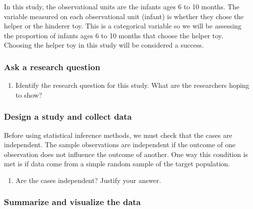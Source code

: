 \documentclass[
]{report}
\providecommand{\tightlist}{%
  \setlength{\itemsep}{0pt}\setlength{\parskip}{0pt}}
\begin{document}
In this study, the observational units are the infants ages 6 to 10 months. The variable measured on each observational unit (infant) is whether they chose the helper or the hinderer toy. This is a categorical variable so we will be assessing the proportion of infants ages 6 to 10 months that choose the helper toy. Choosing the helper toy in this study will be considered a success.

\hypertarget{ask-a-research-question}{%
\subsubsection*{Ask a research question}\label{ask-a-research-question}}

\begin{enumerate}
\def\labelenumi{\arabic{enumi}.}
\tightlist
\item
  Identify the research question for this study. What are the researchers hoping to show?
\end{enumerate}

\vspace{0.6in}

\hypertarget{design-a-study-and-collect-data}{%
\subsubsection*{Design a study and collect data}\label{design-a-study-and-collect-data}}

Before using statistical inference methods, we must check that the cases are independent. The sample observations are independent if the outcome of one observation does not influence the outcome of another. One way this condition is met is if data come from a simple random sample of the target population.

\begin{enumerate}
\def\labelenumi{\arabic{enumi}.}
\setcounter{enumi}{1}
\tightlist
\item
  Are the cases independent? Justify your answer.
\end{enumerate}

\vspace{0.8in}

\hypertarget{summarize-and-visualize-the-data}{%
\subsubsection*{Summarize and visualize the data}\label{summarize-and-visualize-the-data}}
\end{document}
